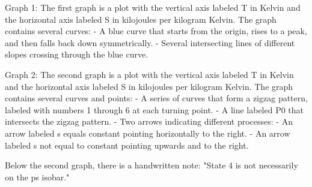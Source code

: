 Graph 1: The first graph is a plot with the vertical axis labeled T in Kelvin and the horizontal axis labeled S in kilojoules per kilogram Kelvin. The graph contains several curves:
- A blue curve that starts from the origin, rises to a peak, and then falls back down symmetrically.
- Several intersecting lines of different slopes crossing through the blue curve.

Graph 2: The second graph is a plot with the vertical axis labeled T in Kelvin and the horizontal axis labeled S in kilojoules per kilogram Kelvin. The graph contains several curves and points:
- A series of curves that form a zigzag pattern, labeled with numbers 1 through 6 at each turning point.
- A line labeled P0 that intersects the zigzag pattern.
- Two arrows indicating different processes:
  - An arrow labeled s equals constant pointing horizontally to the right.
  - An arrow labeled s not equal to constant pointing upwards and to the right.

Below the second graph, there is a handwritten note:
"State 4 is not necessarily on the ps isobar."